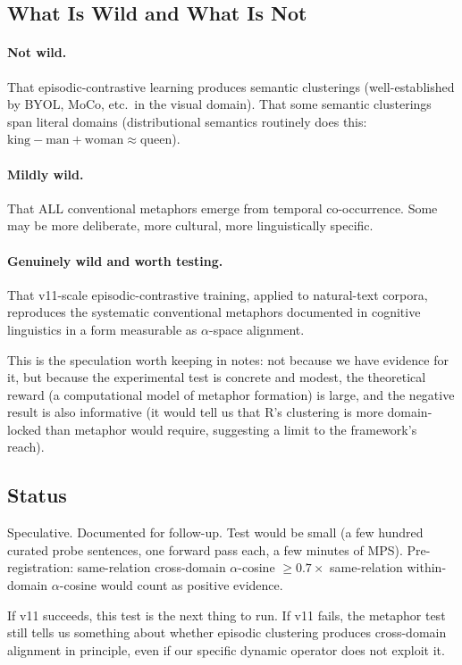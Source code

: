 \documentclass[11pt, a4paper]{article}
\theoremstyle{plain}
\theoremstyle{definition}
\theoremstyle{remark}
\begin{document}
\subsection{What Is Wild and What Is Not}

\paragraph{Not wild.}
That episodic-contrastive learning produces semantic clusterings (well-established by BYOL, MoCo, etc.\ in the visual domain).
That some semantic clusterings span literal domains (distributional semantics routinely does this: $\text{king} - \text{man} + \text{woman} \approx \text{queen}$).

\paragraph{Mildly wild.}
That ALL conventional metaphors emerge from temporal co-occurrence.
Some may be more deliberate, more cultural, more linguistically specific.

\paragraph{Genuinely wild and worth testing.}
That v11-scale episodic-contrastive training, applied to natural-text corpora, reproduces the systematic conventional metaphors documented in cognitive linguistics in a form measurable as $\alpha$-space alignment.

This is the speculation worth keeping in notes: not because we have evidence for it, but because the experimental test is concrete and modest, the theoretical reward (a computational model of metaphor formation) is large, and the negative result is also informative (it would tell us that R's clustering is more domain-locked than metaphor would require, suggesting a limit to the framework's reach).

\subsection{Status}

Speculative. Documented for follow-up. Test would be small (a few hundred curated probe sentences, one forward pass each, a few minutes of MPS).
Pre-registration: same-relation cross-domain $\alpha$-cosine $\geq 0.7 \times$ same-relation within-domain $\alpha$-cosine would count as positive evidence.

If v11 succeeds, this test is the next thing to run.
If v11 fails, the metaphor test still tells us something about whether episodic clustering produces cross-domain alignment in principle, even if our specific dynamic operator does not exploit it.
\end{document}
